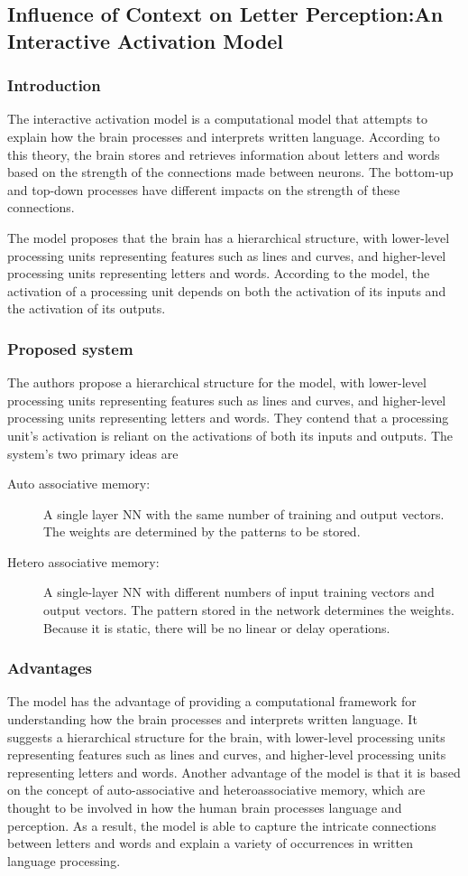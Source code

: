 \subsection{Influence of Context on Letter Perception:An Interactive Activation Model}
\subsubsection{Introduction}
The interactive activation model\cite{auto} is a computational model that
attempts to explain how the brain processes and interprets written language.
According to this theory, the brain stores and retrieves information about
letters and words based on the strength of the connections made between
neurons. The bottom-up and top-down processes have different impacts on the
strength of these connections.

The model proposes that the brain has a hierarchical structure, with
lower-level processing units representing features such as lines and curves,
and higher-level processing units representing letters and words. According to
the model, the activation of a processing unit depends on both the activation
of its inputs and the activation of its outputs.
\subsubsection{Proposed system}
The authors propose a hierarchical structure for the model, with lower-level
processing units representing features such as lines and curves, and
higher-level processing units representing letters and words. They contend that
a processing unit's activation is reliant on the activations of both its inputs
and outputs. The system's two primary ideas are

\begin{description}
    \item[Auto associative memory:]A single layer NN with the same number of training and
    output vectors. The weights are determined by the patterns to be stored.
    \item[Hetero associative memory:]A single-layer NN with different numbers of input
    training vectors and output vectors. The pattern stored in the network
    determines the weights. Because it is static, there will be no linear or delay
    operations.
\end{description}
\subsubsection{Advantages }
The model has the advantage of providing a computational framework for
understanding how the brain processes and interprets written language. It
suggests a hierarchical structure for the brain, with lower-level processing
units representing features such as lines and curves, and higher-level
processing units representing letters and words. Another advantage of the model
is that it is based on the concept of auto-associative and heteroassociative
memory, which are thought to be involved in how the human brain processes
language and perception. As a result, the model is able to capture the
intricate connections between letters and words and explain a variety of
occurrences in written language processing.

